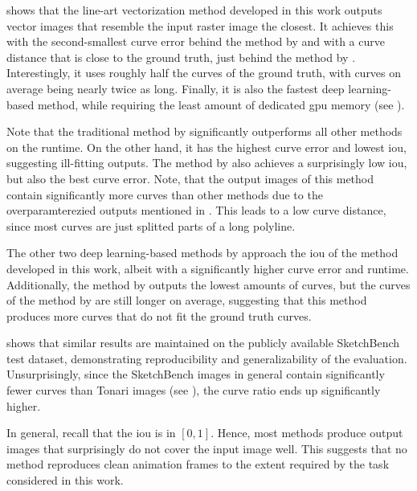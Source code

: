 shows that the line-art vectorization method developed in this work outputs vector images that resemble the input raster image the closest. It achieves this with the second-smallest curve error behind the method by \citet{Puhachov2021KeypointPolyvector} and with a curve distance that is close to the ground truth, just behind the method by \citet{mo2021virtualsketching}. Interestingly, it uses roughly half the curves of the ground truth, with curves on average being nearly twice as long. Finally, it is also the fastest deep learning-based method, while requiring the least amount of dedicated \gls{gpu} memory (see ).


Note that the traditional method by \citet{autotrace} significantly outperforms all other methods on the runtime. On the other hand, it has the highest curve error and lowest \gls{iou}, suggesting ill-fitting outputs. The method by \citet{Puhachov2021KeypointPolyvector} also achieves a surprisingly low \gls{iou}, but also the best curve error. Note, that the output images of this method contain significantly more curves than other methods due to the overparamterezied outputs mentioned in . This leads to a low curve distance, since most curves are just splitted parts of a long polyline.

The other two deep learning-based methods by \citet{mo2021virtualsketching,DBLP:conf/eccv/EgiazarianVAVST20} approach the \gls{iou} of the method developed in this work, albeit with a significantly higher curve error and runtime. Additionally, the method by \citet{DBLP:conf/eccv/EgiazarianVAVST20} outputs the lowest amounts of curves, but the curves of the method by \citet{mo2021virtualsketching} are still longer on average, suggesting that this method produces more curves that do not fit the ground truth curves.

 shows that similar results are maintained on the publicly available SketchBench test dataset, demonstrating reproducibility and generalizability of the evaluation. Unsurprisingly, since the SketchBench images in general contain significantly fewer curves than Tonari images (see ), the curve ratio ends up significantly higher.

In general, recall that the \gls{iou} is in $[0,1]$. Hence, most methods produce output images that surprisingly do not cover the input image well. This suggests that no method reproduces clean animation frames to the extent required by the task considered in this work.
\clearpage
